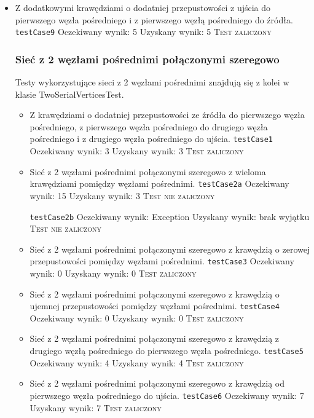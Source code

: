 \begin{itemize}[nosep]
    \item Z dodatkowymi krawędziami o dodatniej przepustowości z ujścia do
    pierwszego węzła pośredniego i z pierwszego węzłą pośredniego do źródła.
    \texttt{testCase9}
    Oczekiwany wynik: 5
    Uzyskany wynik: 5
    \textsc{Test zaliczony}


\subsubsection{Sieć z 2 węzłami pośrednimi połączonymi szeregowo}
Testy wykorzystujące sieci z 2 węzłami pośrednimi znajdują się z kolei w klasie
TwoSerialVerticesTest.
\begin{itemize}[nosep]
    \item Z krawędziami o dodatniej przepustowości ze źródła do pierwszego węzła
    pośredniego, z pierwszego węzła pośredniego do drugiego węzła pośredniego i z
    drugiego węzła pośredniego do ujścia.
    \texttt{testCase1}
    Oczekiwany wynik: 3
    Uzyskany wynik: 3
    \textsc{Test zaliczony}

    \item Sieć z 2 węzłami pośrednimi połączonymi szeregowo z wieloma
    krawędziami pomiędzy węzłami pośrednimi.
    \texttt{testCase2a}
    Oczekiwany wynik: 15
    Uzyskany wynik: 3
    \textsc{Test nie zaliczony}

    \texttt{testCase2b}
    Oczekiwany wynik: Exception
    Uzyskany wynik: brak wyjątku
    \textsc{Test nie zaliczony}

    \item Sieć z 2 węzłami pośrednimi połączonymi szeregowo z krawędzią o
    zerowej przepustowości pomiędzy węzłami pośrednimi.
    \texttt{testCase3}
    Oczekiwany wynik: 0
    Uzyskany wynik: 0
    \textsc{Test zaliczony}

    \item Sieć z 2 węzłami pośrednimi połączonymi szeregowo z krawędzią o
    ujemnej przepustowości pomiędzy węzłami pośrednimi.
    \texttt{testCase4}
    Oczekiwany wynik: 0
    Uzyskany wynik: 0
    \textsc{Test zaliczony}

    \item Sieć z 2 węzłami pośrednimi połączonymi szeregowo z krawędzią z
    drugiego węzłą pośredniego do pierwszego węzła pośredniego.
    \texttt{testCase5}
    Oczekiwany wynik: 4
    Uzyskany wynik: 4
    \textsc{Test zaliczony}

    \item Sieć z 2 węzłami pośrednimi połączonymi szeregowo z krawędzią od
    pierwszego węzła pośredniego do ujścia.
    \texttt{testCase6}
    Oczekiwany wynik: 7
    Uzyskany wynik: 7
    \textsc{Test zaliczony}



\end{itemize}
\end{itemize}
